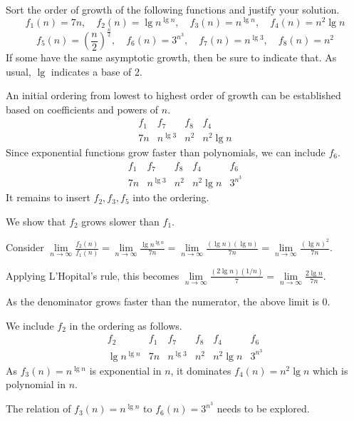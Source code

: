 \documentclass[a4paper]{exam}
\begin{document}
\begin{questions}
  
\question[10]
  Sort the order of growth of the following functions and justify your solution.
  \[
    f_1(n) = 7n,\quad f_2(n) = \lg n^{\lg n},\quad f_3(n) = n^{\lg n},\quad f_4(n) = n^2\lg n
  \]
  \[
    f_5(n) = \left(\frac{n}{2}\right)^{\frac{n}{2}},\quad f_6(n) = 3^{n^3},\quad f_7(n) = n^{\lg 3},\quad f_8(n) = n^2
  \]
  If some have the same asymptotic growth, then be sure to indicate that. As usual, $\lg$ indicates a base of 2.
    \begin{solution}
      An initial ordering from lowest to highest order of growth can be established based on coefficients and powers of $n$.
      \[ \begin{array}{c|c|c|c}
        f_1& f_7&f_8&f_4\\\hline
        7n& n^{\lg3}&n^2&n^2\lg n
      \end{array} \]
      Since exponential functions grow faster than polynomials, we can include $f_6$.
      \[ \begin{array}{c|c|c|c|c}
        f_1& f_7&f_8&f_4&f_6\\\hline
        7n& n^{\lg3}&n^2&n^2\lg n&3^{n^3}
      \end{array} \]
      It remains to insert $f_2,f_3,f_5$ into the ordering.

      We show that $f_2$ grows slower than $f_1$.

      Consider $\lim\limits_{n\to\infty}\frac{f_2(n)}{f_1(n)}=\lim\limits_{n\to\infty}\frac{\lg n^{\lg n}}{7n} = \lim\limits_{n\to\infty}\frac{(\lg n)(\lg n)}{7n} =\lim\limits_{n\to\infty}\frac{(\lg n)^2}{7n} $.

      Applying L'Hopital's rule, this becomes $\lim\limits_{n\to\infty}\frac{(2\lg n)(1/n)}{7}=\lim\limits_{n\to\infty}\frac{2\lg n}{7n}$.

      As the denominator grows faster than the numerator, the above limit is 0.

      We include $f_2$ in the ordering as follows.
      \[ \begin{array}{c|c|c|c|c|c}
        f_2 & f_1& f_7&f_8&f_4&f_6\\\hline
        \lg n^{\lg n} & 7n& n^{\lg3}&n^2&n^2\lg n&3^{n^3}
      \end{array} \]
    As $f_3(n)=n^{\lg n}$ is exponential in $n$, it dominates $f_4(n)=n^2\lg n$ which is polynomial in $n$.

    The relation of $f_3(n)=n^{\lg n}$ to $f_6(n)=3^{n^3}$ needs to be explored.


\end{solution}
\end{questions}
\end{document}
